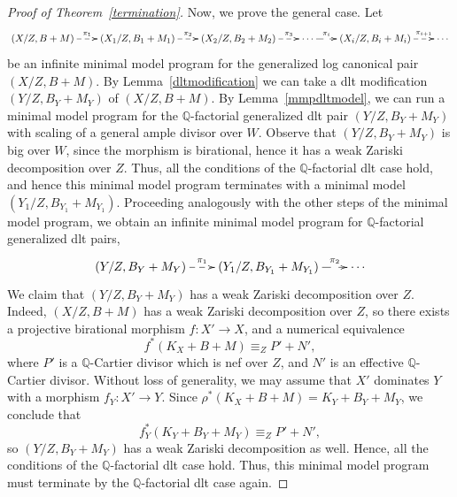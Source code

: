 \documentclass{amsart}
\renewcommand{\qq}{\mathbb{Q}}
\theoremstyle{remark}
\numberwithin{equation}{section}
\begin{document}
\begin{proof}[Proof of Theorem~\ref{termination}]
Now, we prove the general case. 
 Let 
\[
 \xymatrix@C=2em{
(X/Z,B+M)\ar@{-->}[r]^-{\pi_1} & (X_1/Z,B_1+M_1)\ar@{-->}[r]^-{\pi_2} & (X_2/Z,B_2+M_2) \ar@{-->}[r]^-{\pi_3} & 
\cdots \ar@{-->}[r]^-{\pi_i} & (X_i/Z,B_i+M_i)\ar@{-->}[r]^-{\pi_{i+1}} & \cdots
 }
\]
be an infinite minimal model program for the generalized log canonical pair $(X/Z,B+M)$.
By Lemma~\ref{dltmodification} we can take a dlt modification
$(Y/Z,B_Y+M_Y)$ of $(X/Z,B+M)$.
By Lemma~\ref{mmpdltmodel}, we can run a minimal model program for
the $\qq$-factorial generalized dlt pair $(Y/Z,B_Y+M_Y)$ with scaling of a general ample divisor over $W$.
Observe that $(Y/Z,B_Y+M_Y)$ is big over $W$, since the morphism is birational,
hence it has a weak Zariski decomposition over $Z$.
Thus, all the conditions of the $\qq$-factorial dlt case hold, 
and hence this minimal model program terminates with a minimal model $(Y_1/Z,B_{Y_1}+M_{Y_1})$.
Proceeding analogously with the other steps of the minimal model program,
we obtain an infinite minimal model program for $\qq$-factorial generalized dlt pairs, 
\[
 \xymatrix@C=2em{
(Y/Z,B_Y+M_Y)\ar@{-->}[r]^-{\pi_1} & (Y_1/Z,B_{Y_1}+M_{Y_1})\ar@{-->}[r]^-{\pi_2} & \cdots
 }
\]
We claim that $(Y/Z,B_Y+M_Y)$ has a weak Zariski decomposition over $Z$.
Indeed, $(X/Z,B+M)$ has a weak Zariski decomposition over $Z$, so there exists a projective birational morphism
$f\colon X'\rightarrow X$, and a numerical equivalence
\[
f^*(K_X+B+M)\equiv_Z P'+N',
\]
where $P'$ is a $\qq$-Cartier divisor which is nef over $Z$, and $N'$ is an effective $\qq$-Cartier divisor.
Without loss of generality, we may assume that $X'$ dominates $Y$ with a morphism $f_Y\colon X'\rightarrow Y$.
Since $\rho^*(K_X+B+M)=K_Y+B_Y+M_Y$, we conclude that
\[
f_Y^*(K_Y+B_Y+M_Y)\equiv_Z P'+N',
\]
so $(Y/Z,B_Y+M_Y)$ has a weak Zariski decomposition as well.
Hence, all the conditions of the $\qq$-factorial dlt case hold.
Thus, this minimal model program must terminate by the $\qq$-factorial dlt case again.
\end{proof}
\end{document}
